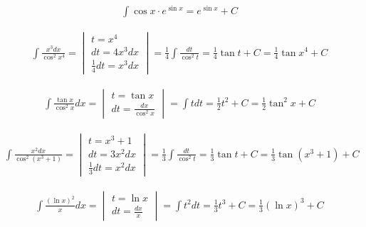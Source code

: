 
\begin{gather*} \int \cos x \cdot e^{\sin x} = e^{\sin x}+C \end{gather*}



\begin{gather*}
  \int \frac{x^3dx}{\cos^2 x^4} =
  \begin{vmatrix}
    t=x^4 \\
    dt=4x^3dx \\
    \frac{1}{4}dt=x^3dx
  \end{vmatrix}
  = \frac{1}{4} \int \frac{dt}{\cos^2 t}
  = \frac{1}{4} \tan t + C
  = \frac{1}{4} \tan x^4 + C
\end{gather*}


\begin{gather*}
  \int \frac{\tan x}{\cos^2 x}dx =
  \begin{vmatrix}
    t=\tan x \\
    dt=\frac{dx}{\cos^2 x}
  \end{vmatrix}
  = \int tdt
  = \frac{1}{2}t^2+C
  = \frac{1}{2}\tan^2 x+C
\end{gather*}


\begin{gather*}
  \int \frac{x^2dx}{\cos^2(x^3+1)} =
  \begin{vmatrix}
    t=x^3+1 \\
    dt=3x^2dx \\
    \frac{1}{3}dt=x^2dx
  \end{vmatrix}
  = \frac{1}{3}\int \frac{dt}{\cos^2 t}
  = \frac{1}{3}\tan t +C
  = \frac{1}{3}\tan (x^3+1)+C
\end{gather*}


\begin{gather*}
  \int \frac{(\ln x)^2}{x}dx =
  \begin{vmatrix}
    t=\ln x \\
    dt=\frac{dx}{x}
  \end{vmatrix}
  = \int t^2dt
  = \frac{1}{3}t^3+C
  = \frac{1}{3}(\ln x)^3+C
\end{gather*}

